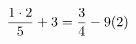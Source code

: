 \documentclass[preview]{standalone}
\begin{document}
\begin{align*}
\special{dvisvgm:raw <g id='unique000'>}\frac{1 \cdot 2}{5} + 3 = \frac{3}{4} - 9(2)\special{dvisvgm:raw </g>}
\end{align*}
\end{document}
